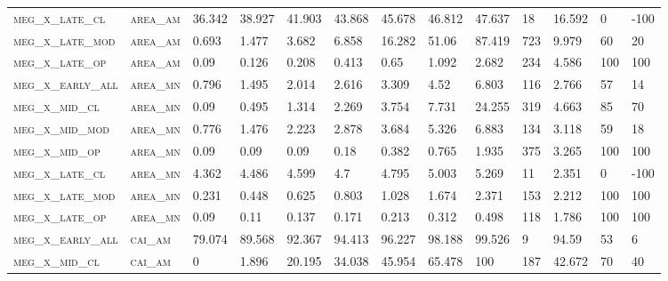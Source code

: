 \begin{landscape}
\begin{center}
\begin{footnotesize}
\begin{longtable}{lllllllllllll}
\textsc{meg\_x\_late\_cl  } & \textsc{area\_am  }   & 36.342   & 38.927   & 41.903   & 43.868   & 45.678   & 46.812   & 47.637    & 18     & 16.592        & 0             & -100          \\
\textsc{meg\_x\_late\_mod } & \textsc{area\_am  }   & 0.693    & 1.477    & 3.682    & 6.858    & 16.282   & 51.06    & 87.419    & 723    & 9.979         & 60            & 20            \\
\textsc{meg\_x\_late\_op  } & \textsc{area\_am  }   & 0.09     & 0.126    & 0.208    & 0.413    & 0.65     & 1.092    & 2.682     & 234    & 4.586         & 100           & 100           \\
\textsc{meg\_x\_early\_all} & \textsc{area\_mn  }   & 0.796    & 1.495    & 2.014    & 2.616    & 3.309    & 4.52     & 6.803     & 116    & 2.766         & 57            & 14            \\
\textsc{meg\_x\_mid\_cl   } & \textsc{area\_mn  }   & 0.09     & 0.495    & 1.314    & 2.269    & 3.754    & 7.731    & 24.255    & 319    & 4.663         & 85            & 70            \\
\textsc{meg\_x\_mid\_mod  } & \textsc{area\_mn  }   & 0.776    & 1.476    & 2.223    & 2.878    & 3.684    & 5.326    & 6.883     & 134    & 3.118         & 59            & 18            \\
\textsc{meg\_x\_mid\_op   } & \textsc{area\_mn  }   & 0.09     & 0.09     & 0.09     & 0.18     & 0.382    & 0.765    & 1.935     & 375    & 3.265         & 100           & 100           \\
\textsc{meg\_x\_late\_cl  } & \textsc{area\_mn  }   & 4.362    & 4.486    & 4.599    & 4.7      & 4.795    & 5.003    & 5.269     & 11     & 2.351         & 0             & -100          \\
\textsc{meg\_x\_late\_mod } & \textsc{area\_mn  }   & 0.231    & 0.448    & 0.625    & 0.803    & 1.028    & 1.674    & 2.371     & 153    & 2.212         & 100           & 100           \\
\textsc{meg\_x\_late\_op  } & \textsc{area\_mn  }   & 0.09     & 0.11     & 0.137    & 0.171    & 0.213    & 0.312    & 0.498     & 118    & 1.786         & 100           & 100           \\
\textsc{meg\_x\_early\_all} & \textsc{cai\_am   }   & 79.074   & 89.568   & 92.367   & 94.413   & 96.227   & 98.188   & 99.526    & 9      & 94.59         & 53            & 6             \\
\textsc{meg\_x\_mid\_cl   } & \textsc{cai\_am   }   & 0        & 1.896    & 20.195   & 34.038   & 45.954   & 65.478   & 100       & 187    & 42.672        & 70            & 40            \\

\end{longtable}
\end{footnotesize}
\end{center}
\end{landscape}

